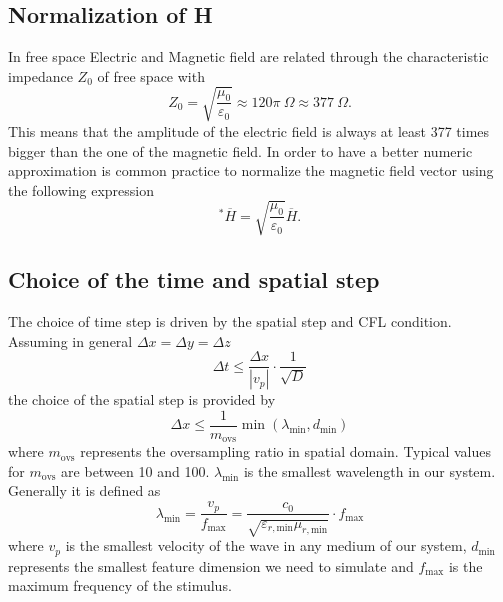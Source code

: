 \subsection{Normalization of H}
In free space Electric and Magnetic field are related through the characteristic impedance $Z_0$ of free space with
\begin{equation*}
	Z_0 = \sqrt{\frac{\mu_0}{\varepsilon_0}} \approx 120\pi~\Omega \approx 377~\Omega.
\end{equation*}
This means that the amplitude of the electric field is always at least 377 times bigger than the one of the magnetic field. In order to have a better numeric approximation is common practice to normalize the magnetic field vector using the following expression
\begin{equation*}
	^*\overline{H} = \sqrt{\frac{\mu_0}{\varepsilon_0}} \overline{H}.
\end{equation*}

\subsection{Choice of the time and spatial step}
The choice of time step is driven by the spatial step and CFL condition. Assuming in general  $\Delta x = \Delta y = \Delta z$ 
\begin{equation*}
	\Delta t \leq \frac{\Delta x}{|v_p|} \cdot \frac{1}{\sqrt{D}}
\end{equation*}
the choice of the spatial step is provided by 
\begin{equation*}
	\Delta x \leq \frac{1}{m_\textrm{ovs}} \min (\lambda_\textrm{min},d_\textrm{min})
\end{equation*}
where $m_\textrm{ovs}$ represents the oversampling ratio in spatial domain. Typical values for $m_\textrm{ovs}$ are between 10 and 100. $\lambda_\textrm{min}$ is the smallest wavelength in our system. Generally it is defined as 
\begin{equation*}
	\lambda_\textrm{min} = \frac{v_p}{f_\textrm{max}} = \frac{c_0}{\sqrt{\varepsilon_{r,\textrm{min}}\mu_{r,\textrm{min}}}} \cdot f_\textrm{max}
\end{equation*}
where $v_p$ is the smallest velocity of the wave in any medium of our system, $d_\textrm{min}$ represents the smallest feature dimension we need to simulate and $f_\textrm{max}$ is the maximum frequency of the stimulus.